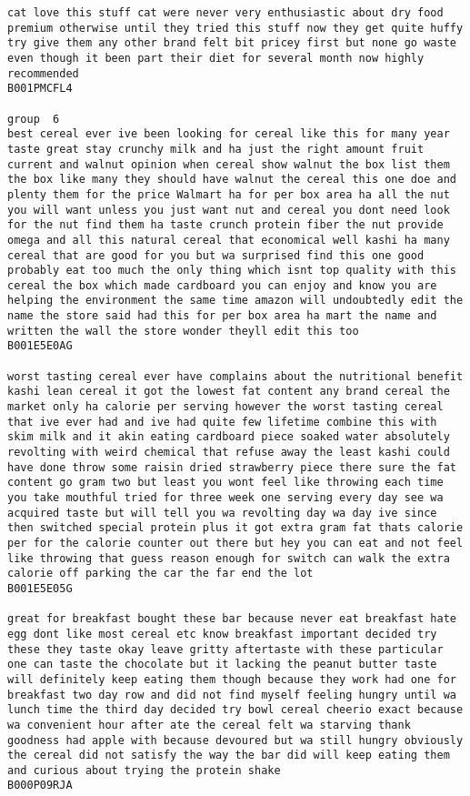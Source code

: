 \documentclass[11pt]{article}
\begin{document}
\begin{Verbatim}[commandchars=\\\{\}]
cat love this stuff cat were never very enthusiastic about dry food premium otherwise until they tried this stuff now they get quite huffy try give them any other brand felt bit pricey first but none go waste even though it been part their diet for several month now highly recommended
B001PMCFL4

group  6
best cereal ever ive been looking for cereal like this for many year taste great stay crunchy milk and ha just the right amount fruit current and walnut opinion when cereal show walnut the box list them the box like many they should have walnut the cereal this one doe and plenty them for the price Walmart ha for per box area ha all the nut you will want unless you just want nut and cereal you dont need look for the nut find them ha taste crunch protein fiber the nut provide omega and all this natural cereal that economical well kashi ha many cereal that are good for you but wa surprised find this one good probably eat too much the only thing which isnt top quality with this cereal the box which made cardboard you can enjoy and know you are helping the environment the same time amazon will undoubtedly edit the name the store said had this for per box area ha mart the name and written the wall the store wonder theyll edit this too
B001E5E0AG

worst tasting cereal ever have complains about the nutritional benefit kashi lean cereal it got the lowest fat content any brand cereal the market only ha calorie per serving however the worst tasting cereal that ive ever had and ive had quite few lifetime combine this with skim milk and it akin eating cardboard piece soaked water absolutely revolting with weird chemical that refuse away the least kashi could have done throw some raisin dried strawberry piece there sure the fat content go gram two but least you wont feel like throwing each time you take mouthful tried for three week one serving every day see wa acquired taste but will tell you wa revolting day wa day ive since then switched special protein plus it got extra gram fat thats calorie per for the calorie counter out there but hey you can eat and not feel like throwing that guess reason enough for switch can walk the extra calorie off parking the car the far end the lot
B001E5E05G

great for breakfast bought these bar because never eat breakfast hate egg dont like most cereal etc know breakfast important decided try these they taste okay leave gritty aftertaste with these particular one can taste the chocolate but it lacking the peanut butter taste will definitely keep eating them though because they work had one for breakfast two day row and did not find myself feeling hungry until wa lunch time the third day decided try bowl cereal cheerio exact because wa convenient hour after ate the cereal felt wa starving thank goodness had apple with because devoured but wa still hungry obviously the cereal did not satisfy the way the bar did will keep eating them and curious about trying the protein shake
B000P09RJA


\end{Verbatim}
\end{document}

